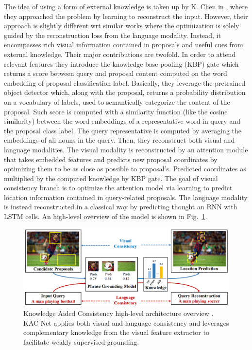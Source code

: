 The idea of using a form of external knowledge is taken up by K. Chen
\etal{} in \cite{chen2018knowledge}, where they approached the problem
by learning to reconstruct the input. However, their approach is
slightly different wrt similar works where the optimization is solely
guided by the reconstruction loss from the language modality. Instead,
it encompasses rich visual information contained in proposals and
useful cues from external knowledge. Their major contributions are
twofold. In order to attend relevant features they introduce the
knowledge base pooling (KBP) gate which returns a score between query
and proposal content computed on the word embedding of proposal
classification label. Basically, they leverage the pretrained object
detector which, along with the proposal, returns a probability
distribution on a vocabulary of labels, used to semantically
categorize the content of the proposal. Such score is computed with a
similarity function (like the cosine similarity) between the word
embeddings of a representative word in query and the proposal class
label. The query representative is computed by averaging the
embeddings of all nouns in the query. Then, they reconstruct both
visual and language modalities. The visual modality is reconstructed
by an attention module that takes embedded features and predicts new
proposal coordinates by optimizing them to be as close as possible to
proposal's. Predicted coordinates as multiplied by the computed
knowledge by KBP gate. The goal of visual consistency branch is to
optimize the attention model via learning to predict location
information contained in query-related proposals. The language
modality is instead reconstructed in a classical way by predicting
thought an RNN with LSTM cells. An high-level overview of the model is
shown in Fig.~\ref{fig:kac-example}.

\begin{figure}
    \centering
    \includegraphics[width=.8\textwidth]{figures/kac-example.png}
    \caption[Knowledge Aided Consistency high-level architecture
    overview]{Knowledge Aided Consistency high-level architecture
    overview \cite{chen2018knowledge}. KAC Net applies both visual and
    language consistency and leverages complementary knowledge from
    the visual feature extractor to facilitate weakly supervised
    grounding.}
    \label{fig:kac-example}
  \end{figure}

